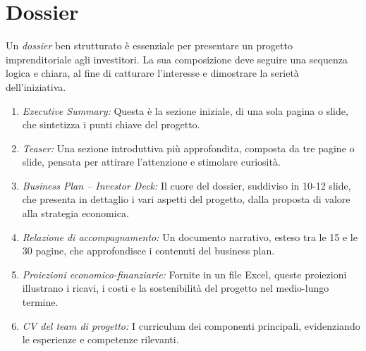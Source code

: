 \section{Dossier}
Un \textit{dossier} ben strutturato è essenziale per presentare un progetto imprenditoriale agli investitori. La sua composizione deve seguire una sequenza logica e chiara, al fine di catturare l’interesse e dimostrare la serietà dell’iniziativa.
\begin{enumerate}
    \item \textit{Executive Summary:} Questa è la sezione iniziale, di una sola pagina o slide, che sintetizza i punti chiave del progetto.
    \item \textit{Teaser:} Una sezione introduttiva più approfondita, composta da tre pagine o slide, pensata per attirare l’attenzione e stimolare curiosità.
    \item \textit{Business Plan – Investor Deck:} Il cuore del dossier, suddiviso in 10-12 slide, che presenta in dettaglio i vari aspetti del progetto, dalla proposta di valore alla strategia economica.
    \item \textit{Relazione di accompagnamento:} Un documento narrativo, esteso tra le 15 e le 30 pagine, che approfondisce i contenuti del business plan.
    \item \textit{Proiezioni economico-finanziarie:} Fornite in un file Excel, queste proiezioni illustrano i ricavi, i costi e la sostenibilità del progetto nel medio-lungo termine.
    \item \textit{CV del team di progetto:} I curriculum dei componenti principali, evidenziando le esperienze e competenze rilevanti.
\end{enumerate}

